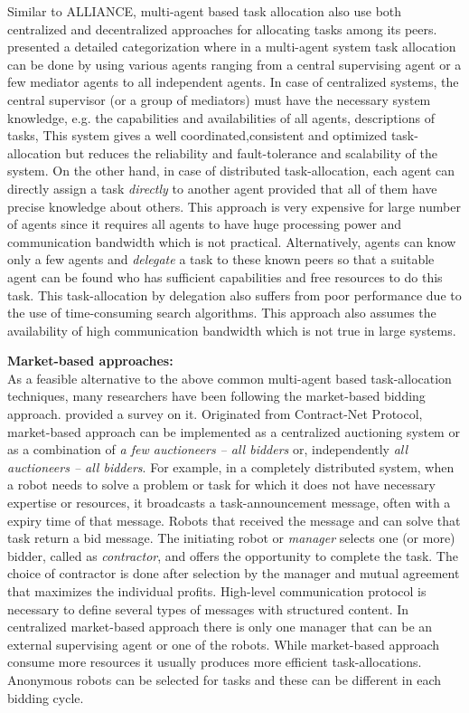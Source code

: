Similar to  ALLIANCE, multi-agent based task allocation also  use both centralized and decentralized approaches for allocating tasks among  its  peers.  presented a detailed categorization where in a multi-agent system task allocation can be done by using various agents ranging from a central supervising agent or a few mediator agents to  all independent agents. In case of centralized systems, the central supervisor (or a group of mediators)  must have the necessary system knowledge, e.g. the capabilities and availabilities of all agents, descriptions of tasks, This system gives a well coordinated,consistent and optimized task-allocation but reduces  the reliability and fault-tolerance and scalability of the system. On the other hand, in case of distributed task-allocation, each agent can directly assign a task {\em directly} to another agent provided that all of them have precise knowledge about others. This approach is very expensive for large number of agents since it requires all agents to have huge processing power and communication bandwidth which is not practical. Alternatively, agents can know only a few agents and {\em delegate} a task to these known peers so that a suitable agent can be found who has sufficient capabilities and free resources to do this task. This task-allocation by delegation also suffers from poor performance  due to the use of time-consuming search algorithms. This approach also assumes the availability of high communication bandwidth which is not true in large systems. 

\textbf{Market-based approaches:}\\
As a feasible alternative to the above common multi-agent based task-allocation techniques, many researchers have been following the market-based bidding approach.  provided a survey on it. Originated from Contract-Net Protocol, market-based approach can be implemented as a centralized auctioning system or as a combination of {\em a few auctioneers -- all bidders} or, independently {\em all auctioneers -- all bidders}. For example, in a completely distributed system, when a robot needs to solve a problem or task for which it does not have necessary expertise or resources, it broadcasts a task-announcement message, often with  a expiry time of that message. Robots that received the message and can solve that task return a bid message. The initiating robot or {\em  manager} selects one (or more) bidder, called as {\em contractor}, and offers the opportunity to complete the task. The choice of contractor is done after selection by the manager and mutual agreement that maximizes the individual profits. High-level communication protocol is necessary to define several types of messages with structured content. In centralized market-based approach there is only one manager that can be an external supervising agent or  one of the robots. While market-based approach consume more resources it usually produces more efficient task-allocations. Anonymous robots can be selected for tasks and these can be different in each bidding cycle.\\

